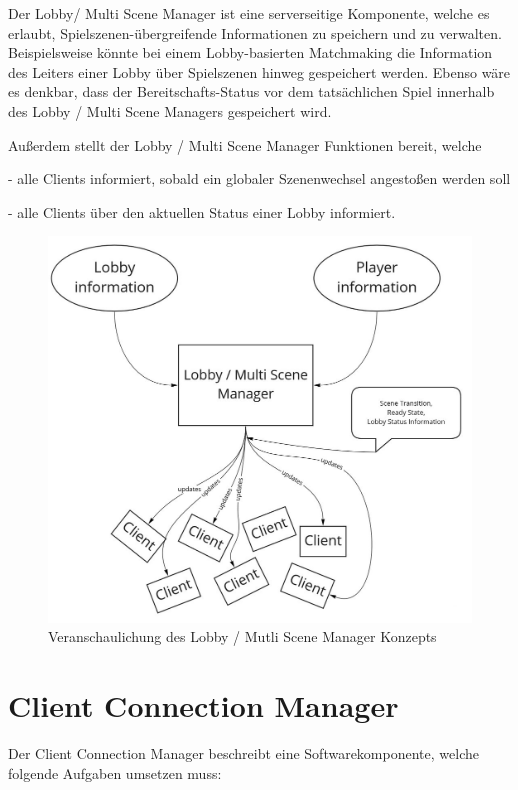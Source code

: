 Der Lobby/ Multi Scene Manager ist eine serverseitige Komponente, welche es erlaubt, Spielszenen-übergreifende Informationen zu speichern und zu verwalten. Beispielsweise könnte bei einem Lobby-basierten Matchmaking die Information des Leiters einer Lobby über Spielszenen hinweg gespeichert werden. Ebenso wäre es denkbar, dass der Bereitschafts-Status vor dem tatsächlichen Spiel innerhalb des Lobby / Multi Scene Managers gespeichert wird.

Außerdem stellt der Lobby / Multi Scene Manager Funktionen bereit, welche

- alle Clients informiert, sobald ein globaler Szenenwechsel angestoßen werden soll

- alle Clients über den aktuellen Status einer Lobby informiert.

\begin{figure}[H]
	\centering
	\includegraphics[width=150mm]{images/Lobby_Multi_Scene_Manager.jpg}
	\caption[Lobby / Mutli Scene Manager Diagramm]{Veranschaulichung des Lobby / Mutli Scene Manager Konzepts}
	\label{pic:Lobby_Multi_Scene_Manager}
\end{figure}


\section{Client Connection Manager}

Der Client Connection Manager beschreibt eine Softwarekomponente, welche folgende Aufgaben umsetzen muss:


